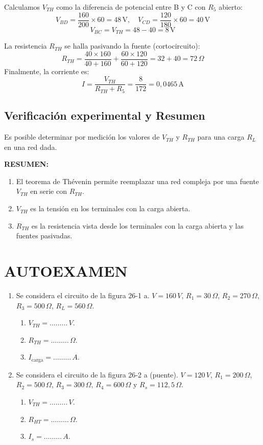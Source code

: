 \documentclass[a4paper,12pt]{article}
\begin{document}
Calculamos $V_{TH}$ como la diferencia de potencial entre B y C con $R_5$ abierto:
\[
V_{BD} = \frac{160}{200} \times 60 = 48 \, \text{V}, \quad V_{CD} = \frac{120}{180} \times 60 = 40 \, \text{V}
\]
\[
V_{BC} = V_{TH} = 48 - 40 = 8 \, \text{V}
\]

La resistencia $R_{TH}$ se halla pasivando la fuente (cortocircuito):
\[
R_{TH} = \frac{40 \times 160}{40 + 160} + \frac{60 \times 120}{60 + 120} = 32 + 40 = 72 \, \Omega
\]
Finalmente, la corriente es:
\[
I = \frac{V_{TH}}{R_{TH} + R_5} = \frac{8}{172} = 0,0465 \, \text{A}
\]

\subsection{Verificación experimental y Resumen}
Es posible determinar por medición los valores de \( V_{TH} \) y \( R_{TH} \) para una carga \( R_L \) en una red dada.

\textbf{RESUMEN:}
\begin{enumerate}[label=\arabic*.]
    \item El teorema de Thévenin permite reemplazar una red compleja por una fuente \( V_{TH} \) en serie con \( R_{TH} \).
    \item \( V_{TH} \) es la tensión en los terminales con la carga abierta.
    \item \( R_{TH} \) es la resistencia vista desde los terminales con la carga abierta y las fuentes pasivadas.
\end{enumerate}

\section{AUTOEXAMEN}
\begin{enumerate}
    \item Se considera el circuito de la figura 26-1 a. $V = 160 \, V$, $R_1 = 30 \, \Omega$, $R_2 = 270 \, \Omega$, $R_3 = 500 \, \Omega$, $R_L = 560 \, \Omega$.
    \begin{enumerate}
        \item $V_{TH} = \ldots \ldots \ldots \, V$.
        \item $R_{TH} = \ldots \ldots \ldots \, \Omega$.
        \item $I_{\text{carga}} = \ldots \ldots \ldots \, A$.
    \end{enumerate}
    
    \item Se considera el circuito de la figura 26-2 a (puente). $V = 120 \, V$, $R_1 = 200 \, \Omega$, $R_2 = 500 \, \Omega$, $R_3 = 300 \, \Omega$, $R_4 = 600 \, \Omega$ y $R_s = 112,5 \, \Omega$.
    \begin{enumerate}
        \item $V_{TH} = \ldots \ldots \ldots \, V$.
        \item $R_{HT} = \ldots \ldots \ldots \, \Omega$.
        \item $I_s = \ldots \ldots \ldots \, A$.
    \end{enumerate}
\end{enumerate}
\end{document}
